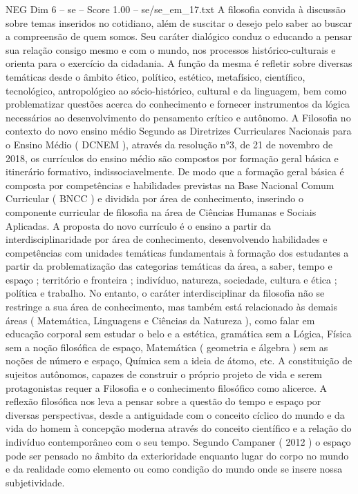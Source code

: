 \begin{textsample}{NEG Dim 6 – se – Score 1.00 – se/se\_em\_17.txt}
A filosofia convida à discussão sobre temas inseridos no cotidiano, além de suscitar o desejo pelo saber ao buscar a compreensão de quem somos.
Seu caráter dialógico conduz o educando a pensar sua relação consigo mesmo e com o mundo, nos processos histórico-culturais e orienta para o exercício da cidadania.
A função da mesma é refletir sobre diversas temáticas desde o âmbito ético, político, estético, metafísico, científico, tecnológico, antropológico ao sócio-histórico, cultural e da linguagem, bem como problematizar questões acerca do conhecimento e fornecer instrumentos da lógica necessários ao desenvolvimento do pensamento crítico e autônomo.
A Filosofia no contexto do novo ensino médio Segundo as Diretrizes Curriculares Nacionais para o Ensino Médio ( DCNEM ), através da resolução n{\EmojiFont °}3, de 21 de novembro de 2018, os currículos do ensino médio são compostos por formação geral básica e itinerário formativo, indissociavelmente.
De modo que a formação geral básica é composta por competências e habilidades previstas na Base Nacional Comum Curricular ( BNCC ) e dividida por área de conhecimento, inserindo o componente curricular de filosofia na área de Ciências Humanas e Sociais Aplicadas.
A proposta do novo currículo é o ensino a partir da interdisciplinaridade por área de conhecimento, desenvolvendo habilidades e competências com unidades temáticas fundamentais à formação dos estudantes a partir da problematização das categorias temáticas da área, a saber, tempo e espaço ; território e fronteira ; indivíduo, natureza, sociedade, cultura e ética ; política e trabalho.
No entanto, o caráter interdisciplinar da filosofia não se restringe a sua área de conhecimento, mas também está relacionado às demais áreas ( Matemática, Linguagens e Ciências da Natureza ), como falar em educação corporal sem estudar o belo e a estética, gramática sem a Lógica, Física sem a noção filosófica de espaço, Matemática ( geometria e álgebra ) sem as noções de número e espaço, Química sem a ideia de átomo, etc.
A constituição de sujeitos autônomos, capazes de construir o próprio projeto de vida e serem protagonistas requer a Filosofia e o conhecimento filosófico como alicerce.
A reflexão filosófica nos leva a pensar sobre a questão do tempo e espaço por diversas perspectivas, desde a antiguidade com o conceito cíclico do mundo e da vida do homem à concepção moderna através do conceito científico e a relação do indivíduo contemporâneo com o seu tempo.
Segundo Campaner ( 2012 ) o espaço pode ser pensado no âmbito da exterioridade enquanto lugar do corpo no mundo e da realidade como elemento ou como condição do mundo onde se insere nossa subjetividade.

\end{textsample}
